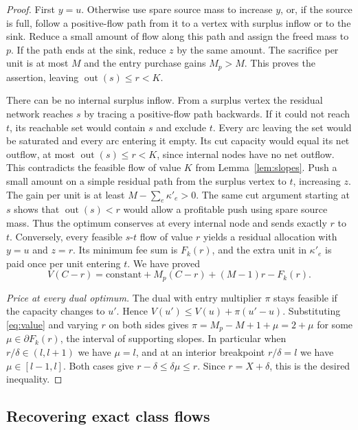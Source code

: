 \documentclass[11pt]{article}
\begin{document}
\begin{proof}
First \(y=u\). Otherwise use spare source mass to increase \(y\), or, if
the source is full, follow a positive-flow path from it to a vertex with
surplus inflow or to the sink. Reduce a small amount of flow along this
path and assign the freed mass to \(p\). If the path ends at the sink,
reduce \(z\) by the same amount. The sacrifice per unit is at most \(M\)
and the entry purchase gains \(M_p>M\). This proves the assertion, leaving
\(\operatorname{out}(s)\le r<K\).

There can be no internal surplus inflow. From a surplus vertex the residual
network reaches \(s\) by tracing a positive-flow path backwards. If it could
not reach \(t\), its reachable set would contain \(s\) and exclude \(t\).
Every arc leaving the set would be saturated and every arc entering it
empty. Its cut capacity would equal its net outflow, at most
\(\operatorname{out}(s)\le r<K\), since internal nodes have no net outflow.
This contradicts the feasible flow of value \(K\) from Lemma~\ref{lem:slopes}.
Push a small amount on a simple residual path from the surplus vertex to
\(t\), increasing \(z\). The gain per unit is at least
\(M-\sum_e\kappa'_e>0\). The same cut argument starting at \(s\) shows
that \(\operatorname{out}(s)<r\) would allow a profitable push using spare
source mass. Thus the optimum conserves at every internal node and sends
exactly \(r\) to \(t\). Conversely, every feasible \(s\)-\(t\) flow of
value \(r\) yields a residual allocation with \(y=u\) and \(z=r\).
Its minimum fee sum is \(F_k(r)\), and the extra unit in \(\kappa'_e\)
is paid once per unit entering \(t\). We have proved
\begin{equation}\label{eq:value}
 V(C-r)=\mathrm{constant}+M_p(C-r)+(M-1)r-F_k(r).
\end{equation}

\emph{Price at every dual optimum.}
The dual with entry multiplier \(\pi\) stays feasible if the capacity
changes to \(u'\). Hence \(V(u')\le V(u)+\pi(u'-u)\). Substituting
\eqref{eq:value} and varying \(r\) on both sides gives
\(\pi=M_p-M+1+\mu=2+\mu\) for some \(\mu\in\partial F_k(r)\), the interval
of supporting slopes. In particular when \(r/\delta\in(l,l+1)\) we have
\(\mu=l\), and at an interior breakpoint \(r/\delta=l\) we have
\(\mu\in[l-1,l]\). Both cases give \(r-\delta\le\delta\mu\le r\).
Since \(r=X+\delta\), this is the desired inequality.
\end{proof}

\subsection{Recovering exact class flows}
\end{document}
